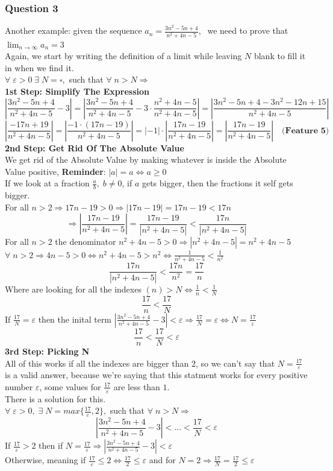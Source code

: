 \subsubsection{Question 3}
\noindent Another example: given the sequence $a_n = \frac{3n^2-5n+4}{n^2+4n-5},\;$ we need to prove that $\lim_{n\to\infty}a_n = 3$\\
Again, we start by writing the definition of a limit while leaving $N$ blank to fill it in when we find it.\\
$\forall\; \varepsilon>0\; \exists\;N = \square ,$ such that $\forall\; n>N\Longrightarrow$\\
\textbf{1st Step: Simplify The Expression}
\[
    |\frac{3n^2-5n+4}{n^2+4n-5}-3| = |\frac{3n^2-5n+4}{n^2+4n-5} -3\cdot\frac{n^2+4n-5}{n^2+4n-5}|=|\frac{3n^2-5n+4-3n^2-12n+15}{n^2+4n-5}|
\]
\[
    |\frac{-17n+19}{n^2+4n-5}| =|\frac{-1\cdot(17n-19)}{n^2+4n-5}| = |-1|\cdot|\frac{17n-19}{n^2+4n-5}| = |\frac{17n-19}{n^2+4n-5}| \quad \textbf{(Feature 5)}
\]
\textbf{2nd Step: Get Rid Of The Absolute Value}\\
We get rid of the Absolute Value by making whatever is inside the Absolute Value positive, \textbf{Reminder}: $|a| = a \iff a \geq 0$\\
If we look at a fraction $\frac{a}{b},\; b\neq 0$, if $a$ gets bigger, then the fractions it self gets bigger.\\
For all $n>2\Longrightarrow 17n-19>0 \Longrightarrow |17n-19|=17n-19<17n$
\[
    \Longrightarrow |\frac{17n-19}{n^2+4n-5}|=\frac{17n-19}{|n^2+4n-5|}<\frac{17n}{|n^2+4n-5|}
\]
For all $n>2$ the denominator $n^2+4n-5>0\Longrightarrow |n^2+4n-5| = n^2+4n-5$\\
$\forall\; n>2\Longrightarrow 4n-5>0 \iff n^2+4n-5>n^2\iff \frac{1}{n^2+4n-5}<\frac{1}{n^2}$ 
\[
    \frac{17n}{|n^2+4n-5|}<\frac{17n}{n^2}=\frac{17}{n}
\]
Where are looking for all the indexes $(n)>N \iff \frac{1}{n}<\frac{1}{N}$
\[
    \frac{17}{n}<\frac{17}{N}
\]
If $\frac{17}{N} = \varepsilon$ then the inital term $|\frac{3n^2-5n+4}{n^2+4n-5}-3|<\varepsilon \Longrightarrow \frac{17}{N}=\varepsilon \iff N=\frac{17}{\varepsilon}$
\[
    \frac{17}{n}<\frac{17}{N}<\varepsilon
\]
\textbf{3rd Step: Picking N}\\
All of this works if all the indexes are bigger than $2$, so we can't say that $N=\frac{17}{\varepsilon}$ is a valid answer, because we're saying that this statment works for every positive number $\varepsilon$, some values for $\frac{17}{\varepsilon}$ are less than $1$.\\
There is a solution for this.\\
$\forall\; \varepsilon>0 ,\; \exists\; N=max\{\frac{17}{\varepsilon},2\},$ such that $\forall\; n>N\Longrightarrow$
\[
    |\frac{3n^2-5n+4}{n^2+4n-5}-3|<\ldots<\frac{17}{N}<\varepsilon
\]
If $\frac{17}{\varepsilon}>2$ then if $N = \frac{17}{\varepsilon}\Longrightarrow |\frac{3n^2-5n+4}{n^2+4n-5}-3|<\varepsilon$\\
Otherwise, meaning if $\frac{17}{\varepsilon}\leq 2 \iff \frac{17}{2}\leq \varepsilon$ and for $N=2\Longrightarrow \frac{17}{N}=\frac{17}{2}\leq \varepsilon$\\